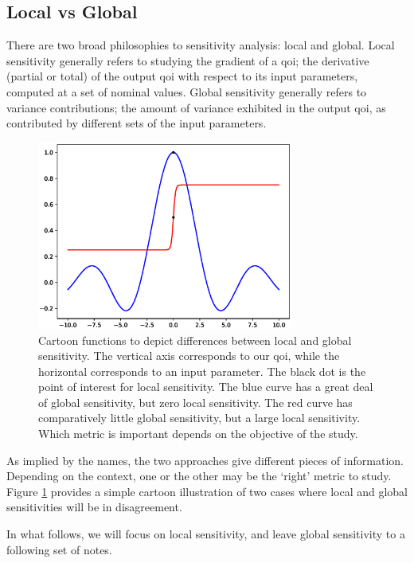 \documentclass[../primer.tex]{subfiles}
\begin{document}
\subsection{Local vs Global}
\label{sec:org4eb0133}
There are two broad philosophies to sensitivity analysis: local and global.
Local sensitivity generally refers to studying the gradient of a qoi; the
derivative (partial or total) of the output qoi with respect to its input
parameters, computed at a set of nominal values. Global sensitivity generally
refers to variance contributions; the amount of variance exhibited in the output
qoi, as contributed by different sets of the input parameters.

\begin{figure}[!ht]
  \centering\includegraphics[width=0.75\textwidth]{./images/ex1}
  \caption{Cartoon functions to depict differences between local and global
  sensitivity. The vertical axis corresponds to our qoi, while the horizontal
  corresponds to an input parameter. The black dot is the point of interest
  for local sensitivity. The blue curve has a great deal of global sensitivity,
  but zero local sensitivity. The red curve has comparatively little global
  sensitivity, but a large local sensitivity. Which metric is important
  depends on the objective of the study.}
  \label{fig:ex1}
\end{figure}

As implied by the names, the two approaches give different pieces of
information. Depending on the context, one or the other may be the `right'
metric to study. Figure \ref{fig:ex1} provides a simple cartoon illustration of
two cases where local and global sensitivities will be in disagreement.

In what follows, we will focus on local sensitivity, and leave global
sensitivity to a following set of notes.
\end{document}
